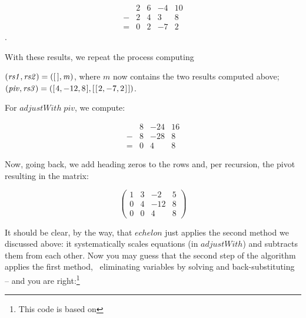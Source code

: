 \documentclass[tikz]{scrreprt}
\newcommand{\Varid}[1]{\mathit{#1}}
\begin{document}
\begin{equation}
\begin{array}{crrrr}
  &  2 & 6 & -4 & 10\\
- &  2 & 4 &  3 &  8\\
= &  0 & 2 & -7 &  2
\end{array}
\end{equation}.

With these results, we repeat the process computing

\begin{minipage}{\textwidth}
\ensuremath{(\Varid{rs1},\Varid{rs2})\mathrel{=}([\mskip1.5mu \mskip1.5mu],\Varid{m})}, where $m$ now contains the two results computed above;\\
\ensuremath{(\Varid{piv},\Varid{rs3})\mathrel{=}([\mskip1.5mu \mathrm{4},\mathbin{-}\mathrm{12},\mathrm{8}\mskip1.5mu],[\mskip1.5mu [\mskip1.5mu \mathrm{2},\mathbin{-}\mathrm{7},\mathrm{2}\mskip1.5mu]\mskip1.5mu])}.
\end{minipage}

For \ensuremath{\Varid{adjustWith}\;\Varid{piv}}, we compute:

\begin{equation}
\begin{array}{crrr}
  & 8 & -24 & 16\\
- & 8 & -28 &  8\\
= & 0 &   4 &  8
\end{array}
\end{equation}

Now, going back, we add heading zeros to the rows and,
per recursion, the pivot resulting in the matrix:

\[
\begin{pmatrix}
1 & 3 & -2  & 5\\
0 & 4 & -12 & 8\\
0 & 0 &   4 & 8
\end{pmatrix}
\]

It should be clear, by the way, that \ensuremath{\Varid{echelon}} just applies
the second method we discussed above:
it systematically scales equations (in \ensuremath{\Varid{adjustWith}}) 
and subtracts them from each other.
Now you may guess that the second step of the algorithm
applies the first method, \ie\ eliminating variables
by solving and back-substituting -- and you are right:\footnote{
This code is based on }
\end{document}
